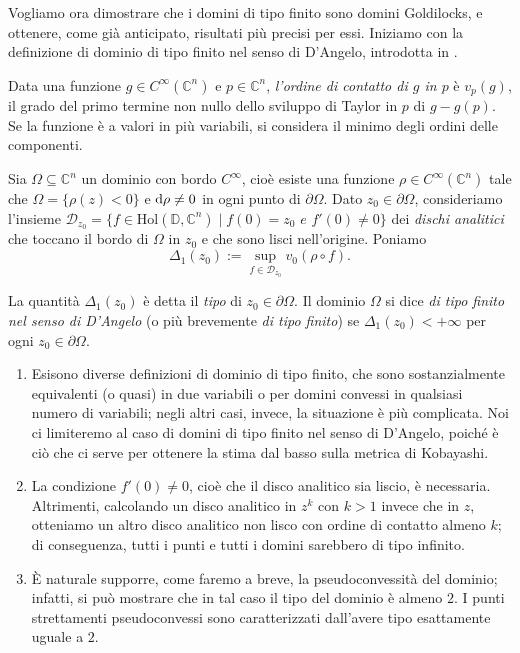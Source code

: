 Vogliamo ora dimostrare che i domini di tipo finito sono domini Goldilocks, e ottenere, come già anticipato, risultati più precisi per essi. Iniziamo con la definizione di dominio di tipo finito nel senso di D'Angelo, introdotta in \cite{D'A}.

\begin{defn}
    Data una funzione $g\in C^\infty(\mathbb{C}^n)$ e $p\in\mathbb{C}^n$, \textit{l'ordine di contatto di $g$ in $p$} è $v_p(g)$, il grado del primo termine non nullo dello sviluppo di Taylor in $p$ di $g-g(p)$. Se la funzione è a valori in più variabili, si considera il minimo degli ordini delle componenti.

    Sia $\Omega\subseteq\mathbb{C}^n$ un dominio con bordo $C^\infty$, cioè esiste una funzione $\rho\in C^\infty(\mathbb{C}^n)$ tale che $\Omega=\{\rho(z)<0\}$ e $\mathop{}\!\mathrm{d}\rho\not=0$ in ogni punto di $\partial\Omega$. Dato $z_0\in\partial\Omega$, consideriamo l'insieme $\mathcal{D}_{z_0}=\{f\in\text{Hol}(\mathbb{D},\mathbb{C}^n)\mid f(0)=z_0\textit{ e }f'(0)\not=0\}$ dei \textit{dischi analitici} che toccano il bordo di $\Omega$ in $z_0$ e che sono lisci nell'origine. Poniamo
    $$\Delta_1(z_0):=\sup_{f\in\mathcal{D}_{z_0}} v_0(\rho\circ f).$$

    La quantità $\Delta_1(z_0)$ è detta il \textit{tipo} di $z_0\in\partial\Omega$. Il dominio $\Omega$ si dice \textit{di tipo finito nel senso di D'Angelo} (o più brevemente \textit{di tipo finito}) se $\Delta_1(z_0)<+\infty$ per ogni $z_0\in\partial\Omega$.
\end{defn}

\begin{oss}
    \begin{enumerate}
        \item Esisono diverse definizioni di dominio di tipo finito, che sono sostanzialmente equivalenti (o quasi) in due variabili o per domini convessi in qualsiasi numero di variabili; negli altri casi, invece, la situazione è più complicata. Noi ci limiteremo al caso di domini di tipo finito nel senso di D'Angelo, poiché è ciò che ci serve per ottenere la stima dal basso sulla metrica di Kobayashi.
        \item La condizione $f'(0)\not=0$, cioè che il disco analitico sia liscio, è necessaria. Altrimenti, calcolando un disco analitico in $z^k$ con $k>1$ invece che in $z$, otteniamo un altro disco analitico non lisco con ordine di contatto almeno $k$; di conseguenza, tutti i punti e tutti i domini sarebbero di tipo infinito.
        \item È naturale supporre, come faremo a breve, la pseudoconvessità del dominio; infatti, si può mostrare che in tal caso il tipo del dominio è almeno $2$. I punti strettamenti pseudoconvessi sono caratterizzati dall'avere tipo esattamente uguale a $2$.
    \end{enumerate}
\end{oss}

